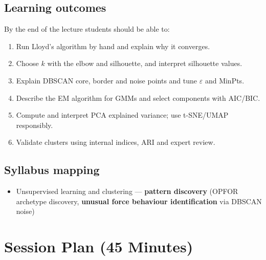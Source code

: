 \documentclass[11pt]{article}
\begin{document}
\subsection*{Learning outcomes}By the end of the lecture students should be able to:\begin{enumerate}\item Run Lloyd's algorithm by hand and explain why it converges.\item Choose $k$ with the elbow and silhouette, and interpret silhouette values.\item Explain DBSCAN core, border and noise points and tune $\varepsilon$ and MinPts.\item Describe the EM algorithm for GMMs and select components with AIC/BIC.\item Compute and interpret PCA explained variance; use t-SNE/UMAP responsibly.\item Validate clusters using internal indices, ARI and expert review.\end{enumerate}

\subsection*{Syllabus mapping}\begin{itemize}\item Unsupervised learning and clustering --- \textbf{pattern discovery} (OPFOR archetype discovery, \textbf{unusual force behaviour identification} via DBSCAN noise)\end{itemize}

\section{Session Plan (45 Minutes)}
\end{document}
